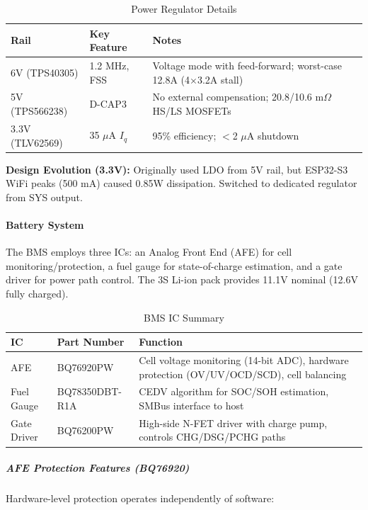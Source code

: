 \begin{table}[H]
\centering
\caption{Power Regulator Details}
\begin{tabular}{@{}llp{7cm}@{}}
\toprule
\textbf{Rail} & \textbf{Key Feature} & \textbf{Notes} \\
\midrule
6V (TPS40305) & 1.2 MHz, FSS & Voltage mode with feed-forward; worst-case 12.8A (4$\times$3.2A stall) \\
5V (TPS566238) & D-CAP3 & No external compensation; 20.8/10.6 m$\Omega$ HS/LS MOSFETs \\
3.3V (TLV62569) & 35 $\mu$A $I_q$ & 95\% efficiency; $<$2 $\mu$A shutdown \\
\bottomrule
\end{tabular}
\end{table}

\textbf{Design Evolution (3.3V):} Originally used LDO from 5V rail, but ESP32-S3 WiFi peaks (500 mA) caused 0.85W dissipation. Switched to dedicated regulator from SYS output.

\paragraph{Battery System}
The BMS employs three ICs: an Analog Front End (AFE) for cell monitoring/protection, a fuel gauge for state-of-charge estimation, and a gate driver for power path control. The 3S Li-ion pack provides 11.1V nominal (12.6V fully charged).

\begin{table}[H]
\centering
\caption{BMS IC Summary}
\label{tab:bms-ics}
\begin{tabular}{@{}llp{6cm}@{}}
\toprule
\textbf{IC} & \textbf{Part Number} & \textbf{Function} \\
\midrule
AFE & BQ76920PW & Cell voltage monitoring (14-bit ADC), hardware protection (OV/UV/OCD/SCD), cell balancing \\
Fuel Gauge & BQ78350DBT-R1A & CEDV algorithm for SOC/SOH estimation, SMBus interface to host \\
Gate Driver & BQ76200PW & High-side N-FET driver with charge pump, controls CHG/DSG/PCHG paths \\
\bottomrule
\end{tabular}
\end{table}

\subparagraph{AFE Protection Features (BQ76920)}
Hardware-level protection operates independently of software:


